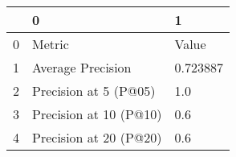 \begin{tabular}{lll}
\toprule
{} &                       0 &         1 \\
\midrule
0 &                  Metric &     Value \\
1 &       Average Precision &  0.723887 \\
2 &   Precision at 5 (P@05) &       1.0 \\
3 &  Precision at 10 (P@10) &       0.6 \\
4 &  Precision at 20 (P@20) &       0.6 \\
\bottomrule
\end{tabular}
